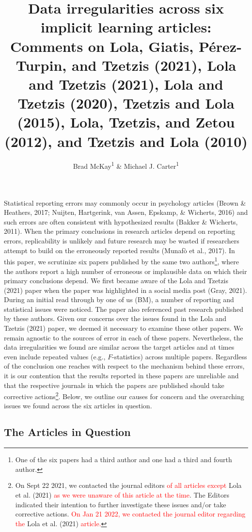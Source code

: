 \documentclass[
  english,
  man, donotrepeattitle,floatsintext]{apa7}
\title{Data irregularities across six implicit learning articles: Comments on Lola, Giatis, Pérez-Turpin, and Tzetzis (2021), Lola and Tzetzis (2021), Lola and Tzetzis (2020), Tzetzis and Lola (2015), Lola, Tzetzis, and Zetou (2012), and Tzetzis and Lola (2010)}
\author{Brad McKay\textsuperscript{1} \& Michael J. Carter\textsuperscript{1}}
\date{}
\affiliation{\vspace{0.5cm}\textsuperscript{1} Department of Kinesiology, McMaster University}
\begin{document}
\maketitle

Statistical reporting errors may commonly occur in psychology articles (Brown \& Heathers, 2017; Nuijten, Hartgerink, van Assen, Epskamp, \& Wicherts, 2016) and such errors are often consistent with hypothesized results (Bakker \& Wicherts, 2011). When the primary conclusions in research articles depend on reporting errors, replicability is unlikely and future research may be wasted if researchers attempt to build on the erroneously reported results (Munafò et al., 2017). In this paper, we scrutinize six papers published by the same two authors\footnote{One of the six papers had a third author and one had a third and fourth author.}, where the authors report a high number of erroneous or implausible data on which their primary conclusions depend. We first became aware of the Lola and Tzetzis (2021) paper when the paper was highlighted in a social media post (Gray, 2021). During an initial read through by one of us (BM), a number of reporting and statistical issues were noticed. The paper also referenced past research published by these authors. Given our concerns over the issues found in the Lola and Tzetzis (2021) paper, we deemed it necessary to examine these other papers. We remain agnostic to the sources of error in each of these papers. Nevertheless, the data irregularities we found are similar across the target articles and at times even include repeated values (e.g., \(F\)-statistics) across multiple papers. Regardless of the conclusion one reaches with respect to the mechanism behind these errors, it is our contention that the results reported in these papers are unreliable and that the respective journals in which the papers are published should take corrective actions\footnote{On Sept 22 2021, we contacted the journal editors \textcolor{red}{of all articles except} Lola et al. (2021) \textcolor{red}{as we were unaware of this article at the time}. The Editors indicated their intention to further investigate these issues and/or take corrective actions. \textcolor{red}{On Jan 21 2022, we contacted the journal editor regarding the} Lola et al. (2021) \textcolor{red}{article.}}. Below, we outline our causes for concern and the overarching issues we found across the six articles in question.

\hypertarget{the-articles-in-question}{%
\subsection{The Articles in Question}\label{the-articles-in-question}}
\end{document}
